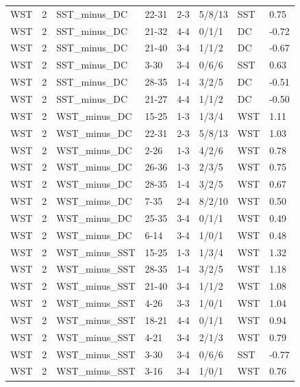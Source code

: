 \begin{table}[!h]
\begin{tabular}[t]{lrllllll}
WST & 2 & SST_minus_DC & 22-31 & 2-3 & 5/8/13 & SST & 0.75\\
\addlinespace
WST & 2 & SST_minus_DC & 21-32 & 4-4 & 0/1/1 & DC & -0.72\\
WST & 2 & SST_minus_DC & 21-40 & 3-4 & 1/1/2 & DC & -0.67\\
WST & 2 & SST_minus_DC & 3-30 & 3-4 & 0/6/6 & SST & 0.63\\
WST & 2 & SST_minus_DC & 28-35 & 1-4 & 3/2/5 & DC & -0.51\\
WST & 2 & SST_minus_DC & 21-27 & 4-4 & 1/1/2 & DC & -0.50\\
\addlinespace
WST & 2 & WST_minus_DC & 15-25 & 1-3 & 1/3/4 & WST & 1.11\\
WST & 2 & WST_minus_DC & 22-31 & 2-3 & 5/8/13 & WST & 1.03\\
WST & 2 & WST_minus_DC & 2-26 & 1-3 & 4/2/6 & WST & 0.78\\
WST & 2 & WST_minus_DC & 26-36 & 1-3 & 2/3/5 & WST & 0.75\\
WST & 2 & WST_minus_DC & 28-35 & 1-4 & 3/2/5 & WST & 0.67\\
\addlinespace
WST & 2 & WST_minus_DC & 7-35 & 2-4 & 8/2/10 & WST & 0.50\\
WST & 2 & WST_minus_DC & 25-35 & 3-4 & 0/1/1 & WST & 0.49\\
WST & 2 & WST_minus_DC & 6-14 & 3-4 & 1/0/1 & WST & 0.48\\
WST & 2 & WST_minus_SST & 15-25 & 1-3 & 1/3/4 & WST & 1.32\\
WST & 2 & WST_minus_SST & 28-35 & 1-4 & 3/2/5 & WST & 1.18\\
\addlinespace
WST & 2 & WST_minus_SST & 21-40 & 3-4 & 1/1/2 & WST & 1.08\\
WST & 2 & WST_minus_SST & 4-26 & 3-3 & 1/0/1 & WST & 1.04\\
WST & 2 & WST_minus_SST & 18-21 & 4-4 & 0/1/1 & WST & 0.94\\
WST & 2 & WST_minus_SST & 4-21 & 3-4 & 2/1/3 & WST & 0.79\\
WST & 2 & WST_minus_SST & 3-30 & 3-4 & 0/6/6 & SST & -0.77\\
\addlinespace
WST & 2 & WST_minus_SST & 3-16 & 3-4 & 1/0/1 & WST & 0.76\\
\bottomrule
\end{tabular}
\end{table}

